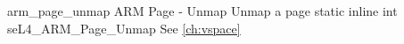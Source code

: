 %
%
%
%

\apidoc
{arm_page_unmap}
{ARM Page - Unmap}
{Unmap a page}
{static inline int seL4\_ARM\_Page\_Unmap}
{
}
{\errorenumdesc}
{See \autoref{ch:vspace}}

